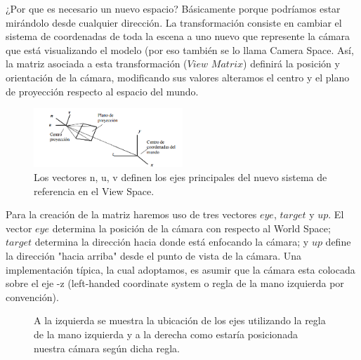 \documentclass[a4paper]{article}
\newcounter{col}
\begin{document}
\par ¿Por que es necesario un nuevo espacio? Básicamente porque podríamos estar mirándolo desde cualquier dirección. La transformación consiste en cambiar el sistema de coordenadas de toda la escena a uno nuevo que represente la cámara que está visualizando el modelo (por eso también se lo llama Camera Space. Así, la matriz asociada a esta transformación ($View$ $Matrix$) definirá la posición y orientación de la cámara, modificando sus valores alteramos el centro y el plano de proyección respecto al espacio del mundo. 


\begin{figure}[h!]
    \centering
    \includegraphics[width=0.50\textwidth]{Imagenes/a.png}
    \caption{Los vectores n, u, v definen los ejes principales del nuevo sistema de referencia en el View Space.}
    \label{fig:mesh1}
\end{figure}



Para la creación de la matriz haremos uso de tres vectores $eye$, $target$ y $up$. El vector $eye$ determina la posición de la cámara con respecto al World Space; $target$ determina la dirección hacia donde está enfocando la cámara; y $up$ define la dirección "hacia arriba" desde el punto de vista de la cámara.  Una implementación típica, la cual adoptamos, es asumir que la cámara esta colocada sobre el eje -z (left-handed coordinate system o regla de la mano izquierda por convención).


\begin{figure}[h!]
 \centering
  \caption{A la izquierda se muestra la ubicación de los ejes utilizando la regla de la mano izquierda y a la derecha como estaría posicionada nuestra cámara según dicha regla.}
 \label{f:coordenadas}
\end{figure} 
 
\end{document}
